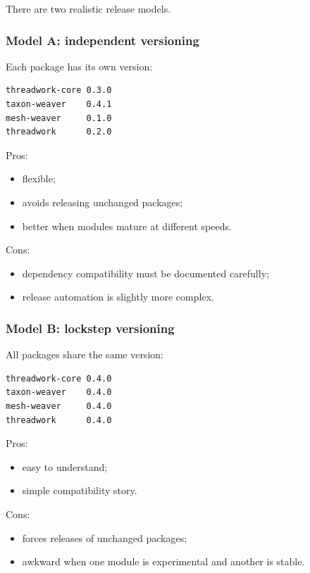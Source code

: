 \documentclass[11pt,a4paper]{article}
\begin{document}
There are two realistic release models.

\subsubsection{Model A: independent versioning}

Each package has its own version:

\begin{Verbatim}[fontsize=\small]
threadwork-core 0.3.0
taxon-weaver    0.4.1
mesh-weaver     0.1.0
threadwork      0.2.0
\end{Verbatim}

Pros:

\begin{itemize}
  \item flexible;
  \item avoids releasing unchanged packages;
  \item better when modules mature at different speeds.
\end{itemize}

Cons:

\begin{itemize}
  \item dependency compatibility must be documented carefully;
  \item release automation is slightly more complex.
\end{itemize}

\subsubsection{Model B: lockstep versioning}

All packages share the same version:

\begin{Verbatim}[fontsize=\small]
threadwork-core 0.4.0
taxon-weaver    0.4.0
mesh-weaver     0.4.0
threadwork      0.4.0
\end{Verbatim}

Pros:

\begin{itemize}
  \item easy to understand;
  \item simple compatibility story.
\end{itemize}

Cons:

\begin{itemize}
  \item forces releases of unchanged packages;
  \item awkward when one module is experimental and another is stable.
\end{itemize}
\end{document}
